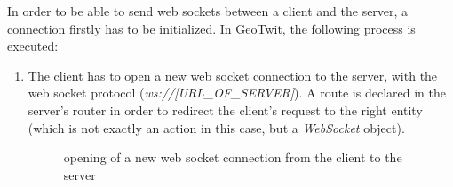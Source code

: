 \documentclass[a4paper,11pt]{report}
\begin{document}
In order to be able to send web sockets between a client and the server, a connection firstly has to be initialized. In GeoTwit, the following process is executed:
\begin{enumerate}
	\item The client has to open a new web socket connection to the server, with the web socket protocol (\emph{ws://[URL\_OF\_SERVER]}). A route is declared in the server's router in order to redirect the client's request to the right entity (which is not exactly an action in this case, but a \emph{WebSocket} object).
	\begin{figure}[H]
	\vspace{-5pt}
	\begin{center}
	\vspace{-5pt}
	\caption{opening of a new web socket connection from the client to the server}
	\end{center}
	\end{figure}
	\vspace{-20pt}
	

\end{enumerate}
\end{document}
